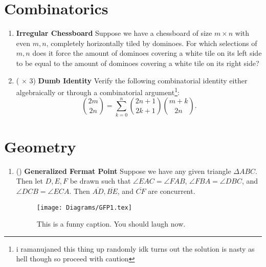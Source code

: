 \documentclass[11pt]{scrartcl}
\begin{document}
\newpage
\section{Combinatorics}
\begin{enumerate}[label=\textbf{C\arabic*}.]
    \item \textbf{Irregular Chessboard} \newline
    Suppose we have a chessboard of size $m \times n$ with even $m, n$, completely horizontally tiled by dominoes. For which selections of $m, n$ does it force the amount of dominoes covering a white tile on its left side to be equal to the amount of dominoes covering a white tile on its right side?

    \item (\fullchili \hspace{1pt} $\times$ 3) \textbf{Dumb Identity} \newline
    Verify the following combinatorial identity either algebraically or through a combinatorial argument\footnote{i ramanujaned this thing up randomly idk turns out the solution is nasty as hell though so proceed with caution}:
    \[ \binom{2m}{2n} = \sum_{k=0}^{n} \binom{2n+1}{2k+1} \binom{m+k}{2n}. \]
\end{enumerate}

\newpage
\section{Geometry}
\begin{enumerate}[label=\textbf{G\arabic*}.]
    \item (\halfchili) \textbf{Generalized Fermat Point} \newline
    Suppose we have any given triangle $\Delta ABC$. Then let $D, E, F$ be drawn such that $\angle{EAC} = \angle{FAB}$, $\angle{FBA} = \angle{DBC}$, and $\angle{DCB} = \angle{ECA}$. Then $\overline{AD}, \overline{BE}$, and $\overline{CF}$ are concurrent.

    \begin{figure}[h]
        \centering
        \texttt{[image: Diagrams/GFP1.tex]} %
        \caption{This is a funny caption. You should laugh now.}
        \label{fig:GFP1}
    \end{figure}
\end{enumerate}

\newpage
\end{document}
